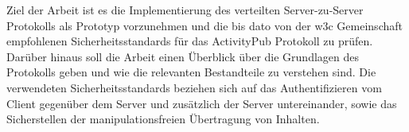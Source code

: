 {	%
	Ziel der Arbeit ist es die Implementierung des verteilten Server-zu-Server Protokolls als Prototyp vorzunehmen und die bis dato von der \gls{w3c} Gemeinschaft empfohlenen Sicherheitsstandards für das ActivityPub Protokoll zu prüfen. Darüber hinaus soll die Arbeit einen Überblick über die Grundlagen des Protokolls geben und wie die relevanten Bestandteile zu verstehen sind. Die verwendeten Sicherheitsstandards beziehen sich auf das Authentifizieren vom Client gegenüber dem Server und zusätzlich der Server untereinander, sowie das Sicherstellen der manipulationsfreien Übertragung von Inhalten.\\
		
	
}

